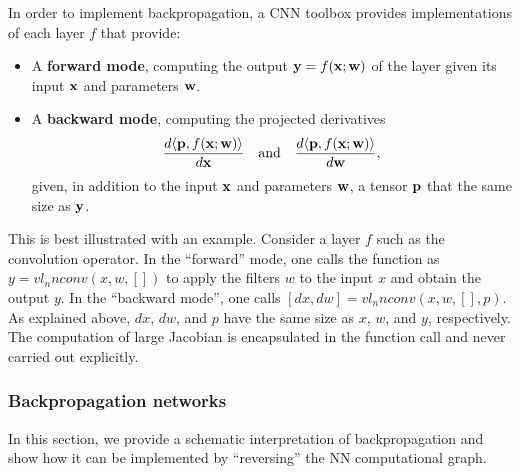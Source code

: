 In order to implement backpropagation, a CNN toolbox provides implementations of each layer $f$ that provide:
\begin{itemize}
	\item A \textbf{forward mode}, computing the output $\mathbf{y} = f(\mathbf{x};\mathbf{w})$ of the layer given its input $\mathbf{x}$ and parameters $\mathbf{w}$.
	\item A \textbf{backward mode}, computing the projected derivatives
	\[
	\frac{d \langle \mathbf{p}, f(\mathbf{x};\mathbf{w}) \rangle}
	{d \mathbf{x}}
	\quad\text{and}\quad
	\frac{d \langle \mathbf{p}, f(\mathbf{x};\mathbf{w}) \rangle}
	{d \mathbf{w}},
	\]
	given, in addition to the input $\mathbf{x}$ and parameters $\mathbf{w}$, a tensor $\mathbf{p}$ that the same size as $\mathbf{y}$.
\end{itemize}
This is best illustrated with an example. Consider a layer $f$ such as the convolution operator. In the ``forward'' mode, one calls the function as $y = vl_nnconv(x,w,[])$ to apply the filters $w$ to the input $x$ and obtain the output $y$. In the ``backward mode'', one calls $[dx, dw] = vl_nnconv(x,w,[],p)$.  As explained above, $dx$, $dw$, and $p$ have the same size as $x$, $w$, and $y$, respectively. The computation of large Jacobian is encapsulated in the function call and never carried out explicitly. 

\subsubsection{Backpropagation networks}\label{s:bpnets}

In this section, we provide a schematic interpretation of backpropagation and show how it can be implemented by ``reversing'' the NN computational graph.


